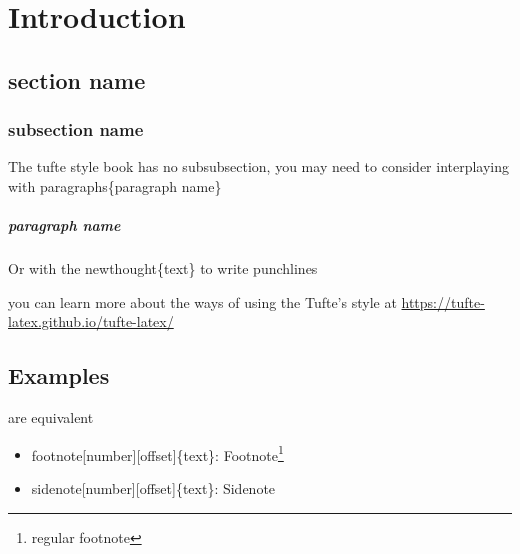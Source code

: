 
\chapter{Introduction}
\label{ch:introduction}

\dochaptoc %

\section{section name} %
\label{sec:section_name}

    \subsection{subsection name} %
    \label{sub:subsection_name}

        The tufte style book has no subsubsection, you may need to consider interplaying with \textsf{paragraphs\{paragraph name\}}

        \paragraph{paragraph name} %
        \label{par:paragraph_name}

            Or with the \textsf{newthought\{text\}} to write punchlines

            you can learn more about the ways of using the Tufte's style at \href{https://tufte-latex.github.io/tufte-latex/}{https://tufte-latex.github.io/tufte-latex/}




\section{Examples} %
\label{sec:examples}

     are equivalent
        \begin{itemize}
            \item \textsf{footnote[number][offset]\{text\}}:
                Footnote\footnote[314][1em]{regular footnote}
            \item \textsf{sidenote[number][offset]\{text\}}:
                Sidenote
        \end{itemize}


